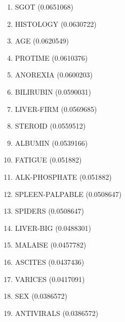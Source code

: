 \begin{enumerate}
\item SGOT (0.0651068)
\item HISTOLOGY (0.0630722)
\item AGE (0.0620549)
\item PROTIME (0.0610376)
\item ANOREXIA (0.0600203)
\item BILIRUBIN (0.0590031)
\item LIVER-FIRM (0.0569685)
\item STEROID (0.0559512)
\item ALBUMIN (0.0539166)
\item FATIGUE (0.051882)
\item ALK-PHOSPHATE (0.051882)
\item SPLEEN-PALPABLE (0.0508647)
\item SPIDERS (0.0508647)
\item LIVER-BIG (0.0488301)
\item MALAISE (0.0457782)
\item ASCITES (0.0437436)
\item VARICES (0.0417091)
\item SEX (0.0386572)
\item ANTIVIRALS (0.0386572)
\end{enumerate}